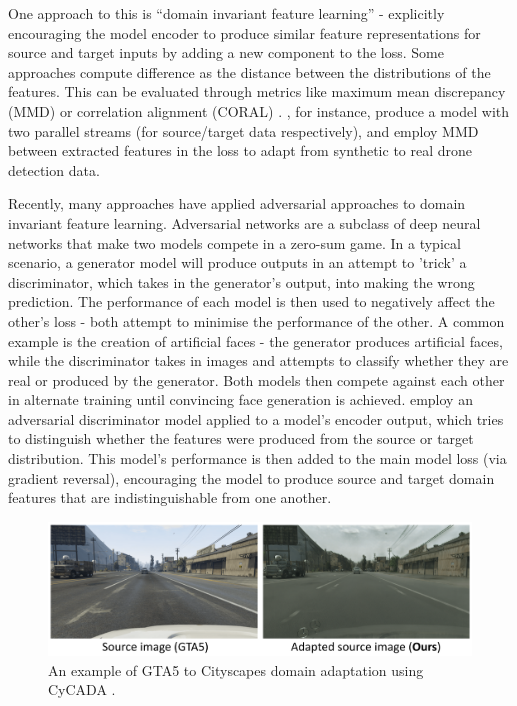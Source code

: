 \documentclass[a4paper,12pt]{report}
\begin{document}
    One approach to this is “domain invariant feature learning” \cite{wilson_survey_2020} - explicitly encouraging the model encoder to produce similar feature representations for source and target inputs by adding a new component to the loss. Some approaches compute difference as the distance between the distributions of the features. This can be evaluated through metrics like maximum mean discrepancy (MMD) \cite{gretton_kernel_2006} or correlation alignment (CORAL) \cite{sun_return_2015}. \cite{rozantsev_beyond_2019}, for instance, produce a model with two parallel streams (for source/target data respectively), and employ MMD between extracted features in the loss to adapt from synthetic to real drone detection data.
    
    Recently, many approaches have applied adversarial approaches to domain invariant feature learning. Adversarial networks \cite{goodfellow_generative_2014} are a subclass of deep neural networks that make two models compete in a zero-sum game. In a typical scenario, a generator model will produce outputs in an attempt to 'trick' a discriminator, which takes in the generator’s output, into making the wrong prediction. The performance of each model is then used to negatively affect the other’s loss - both attempt to minimise the performance of the other. A common example is the creation of artificial faces \cite{karras_progressive_2018} - the generator produces artificial faces, while the discriminator takes in images and attempts to classify whether they are real or produced by the generator. Both models then compete against each other in alternate training until convincing face generation is achieved. \cite{ganin_domain-adversarial_2016} employ an adversarial discriminator model applied to a model’s encoder output, which tries to distinguish whether the features were produced from the source or target distribution. This model’s performance is then added to the main model loss (via gradient reversal), encouraging the model to produce source and target domain features that are indistinguishable from one another.
     
     \begin{figure}[t]
        \centering
        \includegraphics[width=\textwidth]{res/cycada-example.png}
        \caption{An example of GTA5 \cite{richter_playing_2016} to Cityscapes \cite{cordts_cityscapes_2016} domain adaptation using CyCADA \cite{hoffman_cycada_2017}.}
        \label{fig:cycada_example}
    \end{figure}
    
\end{document}
